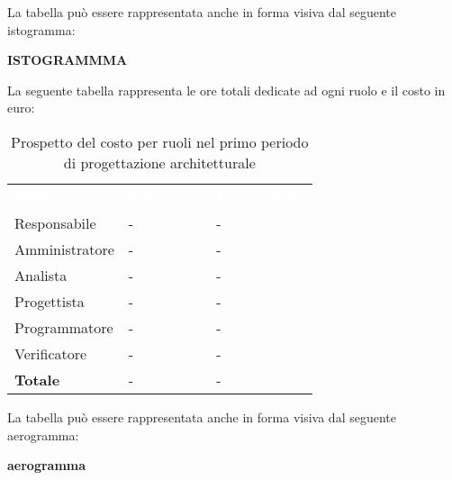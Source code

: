 La tabella può essere rappresentata anche in forma visiva dal seguente istogramma:

\textbf{ISTOGRAMMMA}


La seguente tabella rappresenta le ore totali dedicate ad ogni ruolo e il costo in euro:

\begin{table}[!htbp]
\begin{center}
\renewcommand{\arraystretch}{1.5}
\begin{tabular}{ m{}<{\centering}  m{}<{\centering} m{}<{\centering}}
	\rowcolor{darkblue}
	\textcolor{white}{\textbf{Ruolo}}&\textcolor{white}{\textbf{Totale ore}}&\textcolor{white}{\textbf{Costo totale}}\\ 

	Responsabile  & - & - \\	

	\rowcolor{gray!10} Amministratore & - & - \\
	
	Analista & - & - \\
	
	\rowcolor{gray!10} Progettista & - & - \\
	
	Programmatore & - & - \\
	
	\rowcolor{gray!10} Verificatore & - & - \\
	
	\textbf{Totale} & - & - \\
	
\end{tabular}
\caption{Prospetto del costo per ruoli nel primo periodo di progettazione architetturale}
\end{center}
\end{table}

\noindent La tabella può essere rappresentata anche in forma visiva dal seguente aerogramma:

\textbf{aerogramma}


